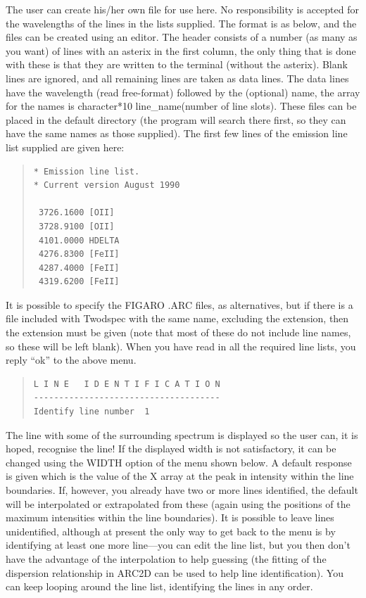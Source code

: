 \documentclass[11pt,twoside]{article}
\newcommand{\xref}[3]{#1}
\begin{document}
The user can create his/her own file for use here.
No responsibility is accepted for the wavelengths of the lines in the
lists supplied.
The format is as below, and the files can be created using an editor.
The header consists of a number (as many as you want) of lines with an
asterix in the first column, the only thing that is done with
these is that they are written to the terminal (without the asterix).
Blank lines are ignored, and all remaining lines are taken as data lines.
The data lines have the wavelength (read free-format) followed by the
(optional) name, the array for the names is character*10 line\_name(number
of line slots).
These files can be placed in the default directory (the program will
search there first, so they can have the same names as those supplied).
The first few lines of the emission line list supplied are given here:

\begin{quote}\begin{verbatim}
* Emission line list.
* Current version August 1990

 3726.1600 [OII]
 3728.9100 [OII]
 4101.0000 HDELTA
 4276.8300 [FeII]
 4287.4000 [FeII]
 4319.6200 [FeII]
\end{verbatim}\end{quote}

It is possible to specify the \xref{FIGARO}{sun86}{} .ARC files, as alternatives, but if
there is a file included with Twodspec with the same name, excluding the
extension, then the extension must be given (note that most of these do
not include line names, so these will be left blank).
When you have read in all the required line lists, you reply ``ok'' to
the above menu.

\begin{quote}\begin{verbatim}
L I N E   I D E N T I F I C A T I O N
-------------------------------------
Identify line number  1
\end{verbatim}\end{quote}

The line with some of the surrounding spectrum is displayed so the user
can, it is hoped, recognise the line!
If the displayed width is not satisfactory, it can be changed using the
WIDTH option of the menu shown below.
A default response is given which is the value of the X array at the
peak in intensity within the line boundaries.
If, however, you already have two or more lines identified, the default
will be interpolated or extrapolated from these (again using the
positions of the maximum intensities within the line boundaries).
It is possible to leave lines unidentified, although at present the only
way to get back to the menu is by identifying at least one more
line---you can edit the line list, but you then don't have the advantage
of the interpolation to help guessing (the fitting of the dispersion
relationship in ARC2D can be used to help line identification).
You can keep looping around the line list, identifying the lines in any
order.
\end{document}
